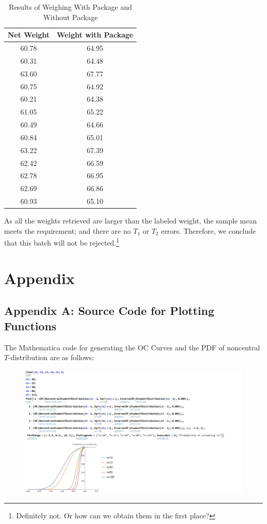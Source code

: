 \documentclass[12pt]{article}
\begin{document}
\begin{table}[htbp]
    \centering
    \begin{tabular}{cc}
        \toprule
        Net Weight & Weight with Package \\
        \midrule
        60.78 & 64.95 \\
        60.31 & 64.48 \\
        63.60 & 67.77 \\
        60.75 & 64.92 \\
        60.21 & 64.38 \\
        61.05 & 65.22 \\
        60.49 & 64.66 \\
        60.84 & 65.01 \\
        63.22 & 67.39 \\
        62.42 & 66.59 \\
        62.78 & 66.95 \\
        62.69 & 66.86 \\
        60.93 & 65.10 \\
        \bottomrule
    \end{tabular}
    \caption{Results of Weighing With Package and Without Package}
\end{table}

As all the weights retrieved are larger than the labeled weight, the sample mean meets the requirement; and there are no $T_1$ or $T_2$ errors. Therefore, we conclude that this batch will not be rejected.\footnote{Definitely not. Or how can we obtain them in the first place?}

\newpage
\section{Appendix}

\subsection{Appendix A: Source Code for Plotting Functions}
\label{mmacode}

The Mathematica code for generating the OC Curves and the PDF of noncentral $T$-distribution are as follows:

\begin{figure}[htbp]
    \centering
    \includegraphics[scale=0.5]{img/oc_t_code.png}
\end{figure}
\end{document}
